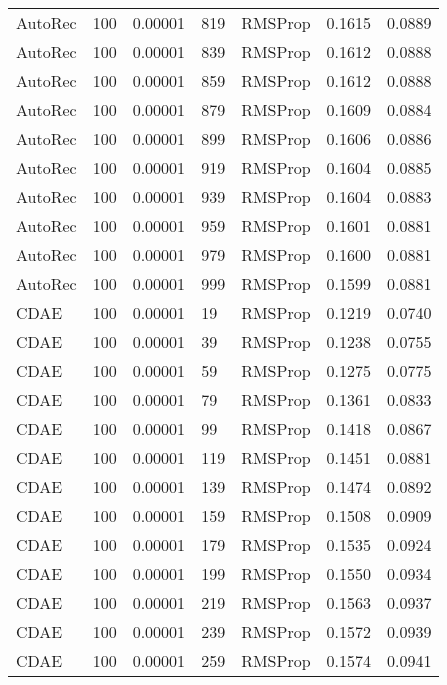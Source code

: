 \begin{tabular}{llrllrr}
 AutoRec &  100 &  0.00001 &   819 &   RMSProp &  0.1615 &       0.0889 \\
 AutoRec &  100 &  0.00001 &   839 &   RMSProp &  0.1612 &       0.0888 \\
 AutoRec &  100 &  0.00001 &   859 &   RMSProp &  0.1612 &       0.0888 \\
 AutoRec &  100 &  0.00001 &   879 &   RMSProp &  0.1609 &       0.0884 \\
 AutoRec &  100 &  0.00001 &   899 &   RMSProp &  0.1606 &       0.0886 \\
 AutoRec &  100 &  0.00001 &   919 &   RMSProp &  0.1604 &       0.0885 \\
 AutoRec &  100 &  0.00001 &   939 &   RMSProp &  0.1604 &       0.0883 \\
 AutoRec &  100 &  0.00001 &   959 &   RMSProp &  0.1601 &       0.0881 \\
 AutoRec &  100 &  0.00001 &   979 &   RMSProp &  0.1600 &       0.0881 \\
 AutoRec &  100 &  0.00001 &   999 &   RMSProp &  0.1599 &       0.0881 \\
    CDAE &  100 &  0.00001 &    19 &   RMSProp &  0.1219 &       0.0740 \\
    CDAE &  100 &  0.00001 &    39 &   RMSProp &  0.1238 &       0.0755 \\
    CDAE &  100 &  0.00001 &    59 &   RMSProp &  0.1275 &       0.0775 \\
    CDAE &  100 &  0.00001 &    79 &   RMSProp &  0.1361 &       0.0833 \\
    CDAE &  100 &  0.00001 &    99 &   RMSProp &  0.1418 &       0.0867 \\
    CDAE &  100 &  0.00001 &   119 &   RMSProp &  0.1451 &       0.0881 \\
    CDAE &  100 &  0.00001 &   139 &   RMSProp &  0.1474 &       0.0892 \\
    CDAE &  100 &  0.00001 &   159 &   RMSProp &  0.1508 &       0.0909 \\
    CDAE &  100 &  0.00001 &   179 &   RMSProp &  0.1535 &       0.0924 \\
    CDAE &  100 &  0.00001 &   199 &   RMSProp &  0.1550 &       0.0934 \\
    CDAE &  100 &  0.00001 &   219 &   RMSProp &  0.1563 &       0.0937 \\
    CDAE &  100 &  0.00001 &   239 &   RMSProp &  0.1572 &       0.0939 \\
    CDAE &  100 &  0.00001 &   259 &   RMSProp &  0.1574 &       0.0941 \\

\end{tabular}
